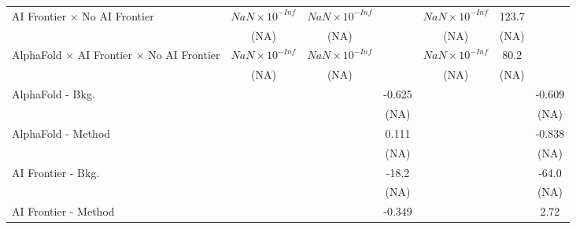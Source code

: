 \begin{tabular}{lcccccc}
   AI Frontier $\times$ No AI Frontier                                        & $NaN\times 10^{-Inf}$  & $NaN\times 10^{-Inf}$  &                        & $NaN\times 10^{-Inf}$  & 123.7  &   \\   
                                                                              & (NA)                   & (NA)                   &                        & (NA)                   & (NA)   &   \\   
   AlphaFold $\times$ AI Frontier $\times$ No AI Frontier                     & $NaN\times 10^{-Inf}$  & $NaN\times 10^{-Inf}$  &                        & $NaN\times 10^{-Inf}$  & 80.2   &   \\   
                                                                              & (NA)                   & (NA)                   &                        & (NA)                   & (NA)   &   \\   
   AlphaFold - Bkg.                                                           &                        &                        & -0.625                 &                        &        & -0.609\\   
                                                                              &                        &                        & (NA)                   &                        &        & (NA)\\   
   AlphaFold - Method                                                         &                        &                        & 0.111                  &                        &        & -0.838\\   
                                                                              &                        &                        & (NA)                   &                        &        & (NA)\\   
   AI Frontier - Bkg.                                                         &                        &                        & -18.2                  &                        &        & -64.0\\   
                                                                              &                        &                        & (NA)                   &                        &        & (NA)\\   
   AI Frontier - Method                                                       &                        &                        & -0.349                 &                        &        & 2.72\\   

\end{tabular}
